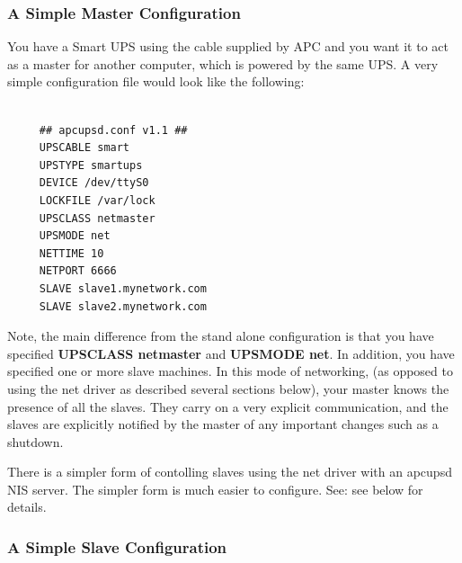 \label{A-Simple-Master-Configuration}

\subsubsection*{A Simple Master Configuration}

\label{index-Configuration_002c-Master-74}
\label{index-Master_002c-config-example-75}
\label{index-Example_002c-Master-conf-76}
You have a Smart UPS using the cable supplied by APC and you want it to act as
a master for another computer, which is powered by the same UPS. A very simple
configuration file would look like the following: 

\footnotesize
\begin{verbatim}
     
     ## apcupsd.conf v1.1 ##
     UPSCABLE smart
     UPSTYPE smartups
     DEVICE /dev/ttyS0
     LOCKFILE /var/lock
     UPSCLASS netmaster
     UPSMODE net
     NETTIME 10
     NETPORT 6666
     SLAVE slave1.mynetwork.com
     SLAVE slave2.mynetwork.com
\end{verbatim}
\normalsize

Note, the main difference from the stand alone configuration is that you have
specified {\bf UPSCLASS netmaster} and {\bf UPSMODE net}.  In addition, you
have specified one or more slave machines.  In this mode of networking, (as
opposed to using the net driver as described several sections below), your
master knows the presence of all the slaves.  They carry on a very explicit
communication, and the slaves are explicitly notified by the master of any
important changes such as a shutdown.  

There is a simpler form of contolling slaves using the net driver with an
apcupsd NIS server. The simpler form is much easier to configure. See: see 
below for details. 

\label{A-Simple-Slave-Configuration}

\subsubsection*{A Simple Slave Configuration}

